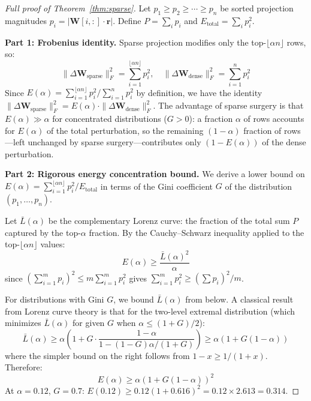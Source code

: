 \begin{proof}[Full proof of Theorem~\ref{thm:sparse}]
Let $p_1 \geq p_2 \geq \cdots \geq p_n$ be sorted projection magnitudes $p_i = |\mathbf{W}[i,:] \cdot \mathbf{r}|$.
Define $P = \sum_i p_i$ and $E_{\text{total}} = \sum_i p_i^2$.

\textbf{Part 1: Frobenius identity.}
Sparse projection modifies only the top-$\lfloor \alpha n \rfloor$ rows, so:
\begin{equation}
    \|\Delta\mathbf{W}_{\text{sparse}}\|_F^2 = \sum_{i=1}^{\lfloor \alpha n \rfloor} p_i^2, \quad \|\Delta\mathbf{W}_{\text{dense}}\|_F^2 = \sum_{i=1}^n p_i^2
\end{equation}
Since $E(\alpha) = \sum_{i=1}^{\lfloor\alpha n\rfloor} p_i^2 / \sum_{i=1}^n p_i^2$ by definition, we have the identity $\|\Delta\mathbf{W}_{\text{sparse}}\|_F^2 = E(\alpha) \cdot \|\Delta\mathbf{W}_{\text{dense}}\|_F^2$.
The advantage of sparse surgery is that $E(\alpha) \gg \alpha$ for concentrated distributions ($G > 0$): a fraction $\alpha$ of rows accounts for $E(\alpha)$ of the total perturbation, so the remaining $(1-\alpha)$ fraction of rows---left unchanged by sparse surgery---contributes only $(1-E(\alpha))$ of the dense perturbation.

\textbf{Part 2: Rigorous energy concentration bound.}
We derive a lower bound on $E(\alpha) = \sum_{i=1}^{\lfloor\alpha n\rfloor} p_i^2 / E_{\text{total}}$ in terms of the Gini coefficient $G$ of the distribution $(p_1, \ldots, p_n)$.

Let $\bar{L}(\alpha)$ be the complementary Lorenz curve: the fraction of the total sum $P$ captured by the top-$\alpha$ fraction.
By the Cauchy--Schwarz inequality applied to the top-$\lfloor\alpha n\rfloor$ values:
\begin{equation}
    E(\alpha) \geq \frac{\bar{L}(\alpha)^2}{\alpha}
\end{equation}
since $(\sum_{i=1}^m p_i)^2 \leq m \sum_{i=1}^m p_i^2$ gives $\sum_{i=1}^m p_i^2 \geq (\sum p_i)^2/m$.

For distributions with Gini $G$, we bound $\bar{L}(\alpha)$ from below.
A classical result from Lorenz curve theory is that for the two-level extremal distribution (which minimizes $\bar{L}(\alpha)$ for given $G$ when $\alpha \leq (1+G)/2$):
\begin{equation}
    \bar{L}(\alpha) \geq \alpha\!\left(1 + G\cdot\frac{1-\alpha}{1-(1-G)\alpha/(1+G)}\right) \geq \alpha(1 + G(1-\alpha))
\end{equation}
where the simpler bound on the right follows from $1-x \geq 1/(1+x)$.
Therefore:
\begin{equation}
    E(\alpha) \geq \alpha(1+G(1-\alpha))^2
\end{equation}
At $\alpha = 0.12$, $G = 0.7$: $E(0.12) \geq 0.12(1+0.616)^2 = 0.12 \times 2.613 = 0.314$.


\end{proof}
